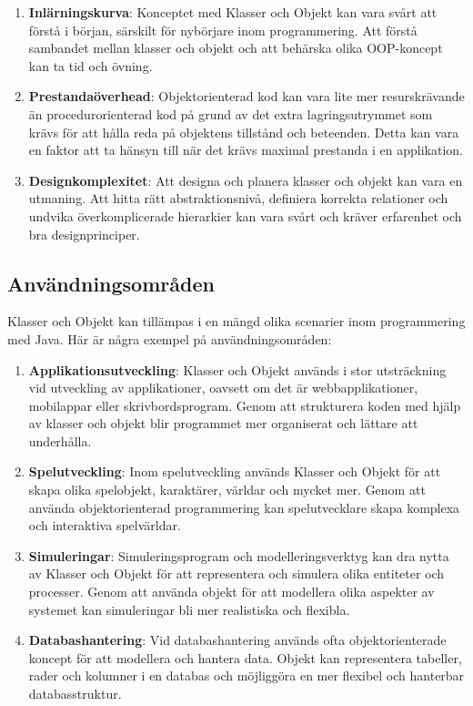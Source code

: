 \begin{enumerate}
\def\labelenumi{\arabic{enumi}.}
\item
  \textbf{Inlärningskurva}: Konceptet med Klasser och Objekt kan vara
  svårt att förstå i början, särskilt för nybörjare inom programmering.
  Att förstå sambandet mellan klasser och objekt och att behärska olika
  OOP-koncept kan ta tid och övning.
\item
  \textbf{Prestandaöverhead}: Objektorienterad kod kan vara lite mer
  resurskrävande än procedurorienterad kod på grund av det extra
  lagringsutrymmet som krävs för att hålla reda på objektens tillstånd
  och beteenden. Detta kan vara en faktor att ta hänsyn till när det
  krävs maximal prestanda i en applikation.
\item
  \textbf{Designkomplexitet}: Att designa och planera klasser och objekt
  kan vara en utmaning. Att hitta rätt abstraktionsnivå, definiera
  korrekta relationer och undvika överkomplicerade hierarkier kan vara
  svårt och kräver erfarenhet och bra designprinciper.
\end{enumerate}

\hypertarget{anvuxe4ndningsomruxe5den}{%
\subsection{Användningsområden}\label{anvuxe4ndningsomruxe5den}}

Klasser och Objekt kan tillämpas i en mängd olika scenarier inom
programmering med Java. Här är några exempel på användningsområden:

\begin{enumerate}
\def\labelenumi{\arabic{enumi}.}
\item
  \textbf{Applikationsutveckling}: Klasser och Objekt används i stor
  utsträckning vid utveckling av applikationer, oavsett om det är
  webbapplikationer, mobilappar eller skrivbordsprogram. Genom att
  strukturera koden med hjälp av klasser och objekt blir programmet mer
  organiserat och lättare att underhålla.
\item
  \textbf{Spelutveckling}: Inom spelutveckling används Klasser och
  Objekt för att skapa olika spelobjekt, karaktärer, världar och mycket
  mer. Genom att använda objektorienterad programmering kan
  spelutvecklare skapa komplexa och interaktiva spelvärldar.
\item
  \textbf{Simuleringar}: Simuleringsprogram och modelleringsverktyg kan
  dra nytta av Klasser och Objekt för att representera och simulera
  olika entiteter och processer. Genom att använda objekt för att
  modellera olika aspekter av systemet kan simuleringar bli mer
  realistiska och flexibla.
\item
  \textbf{Databashantering}: Vid databashantering används ofta
  objektorienterade koncept för att modellera och hantera data. Objekt
  kan representera tabeller, rader och kolumner i en databas och
  möjliggöra en mer flexibel och hanterbar databasstruktur.
\end{enumerate}

